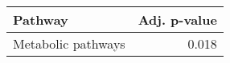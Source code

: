 \begin{tabular}{lr}
\toprule
            Pathway &  Adj. p-value \\
\midrule
 Metabolic pathways &         0.018 \\
\bottomrule
\end{tabular}
